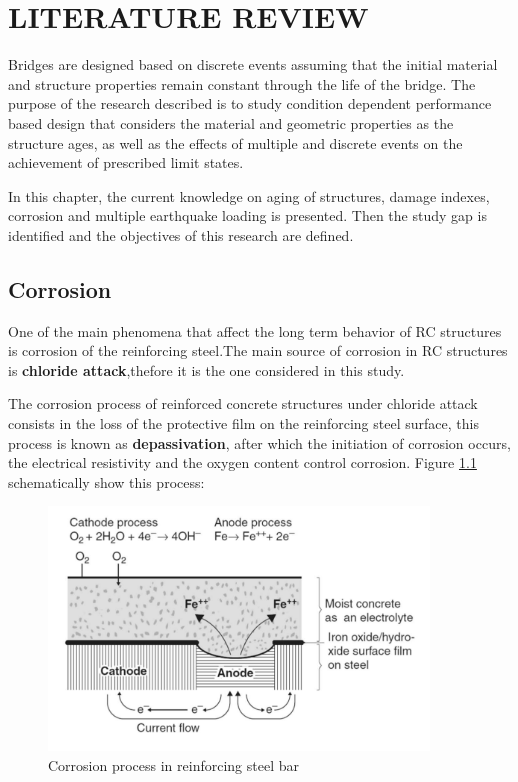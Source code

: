 \chapter{LITERATURE REVIEW}
\label{chap-two}
Bridges are designed based on discrete events assuming that the initial material and structure properties remain constant through the life of the bridge. The purpose of the research described is to study condition dependent performance based design that considers the material and geometric properties as the structure ages, as well as the effects of multiple and discrete events on the achievement of prescribed limit states.

In this chapter, the current knowledge on aging of structures, damage indexes, corrosion and multiple earthquake loading is presented. Then the study gap is identified and the objectives of this research are defined.

\section{Corrosion}

One of the main phenomena that affect the long term behavior of RC structures is corrosion of the reinforcing steel.The main source of corrosion in RC structures is \textbf{chloride attack},thefore it is the one considered in this study.

The corrosion process of reinforced concrete structures under chloride attack consists in the loss of the protective film on the reinforcing steel surface, this process is known as \textbf{depassivation}, after which the initiation of corrosion occurs, the electrical resistivity and the oxygen content control corrosion. Figure \ref{fig:corr1} schematically show this process:

\begin{figure}[htbp]
\centering
\includegraphics[width=0.9\textwidth]{Chapter-2/figs/Corrosion_Process}
\caption{Corrosion process in reinforcing steel bar \cite{Mehta2014}}
\label{fig:corr1}
\end{figure}

